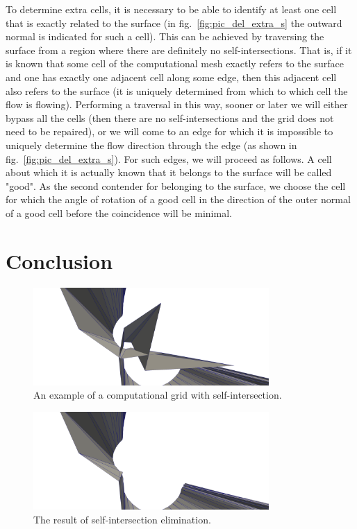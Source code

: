 \documentclass[
11pt,%
tightenlines,%
twoside,%
onecolumn,%
nofloats,%
nobibnotes,%
nofootinbib,%
superscriptaddress,%
noshowpacs,%
centertags]%
{revtex4}
\begin{document}
To determine extra cells, it is necessary to be able to identify at least one cell that is exactly related to the surface (in fig.~\ref{fig:pic_del_extra_s} the outward normal is indicated for such a cell).
This can be achieved by traversing the surface from a region where there are definitely no self-intersections.
That is, if it is known that some cell of the computational mesh exactly refers to the surface and one has exactly one adjacent cell along some edge, then this adjacent cell also refers to the surface (it is uniquely determined from which to which cell the flow is flowing).
Performing a traversal in this way, sooner or later we will either bypass all the cells (then there are no self-intersections and the grid does not need to be repaired), or we will come to an edge for which it is impossible to uniquely determine the flow direction through the edge (as shown in fig.~\ref{fig:pic_del_extra_s}).
For such edges, we will proceed as follows.
A cell about which it is actually known that it belongs to the surface will be called "good".
As the second contender for belonging to the surface, we choose the cell for which the angle of rotation of a good cell in the direction of the outer normal of a good cell before the coincidence will be minimal.

\section{Conclusion}

\begin{figure}[h]
\includegraphics[width=0.8\textwidth]{pics/pic_example_before.png}
\caption{An example of a computational grid with self-intersection.}\label{fig:pic_example_before}
\end{figure}

\begin{figure}[h]
\includegraphics[width=0.8\textwidth]{pics/pic_example_after.png}
\caption{The result of self-intersection elimination.}\label{fig:pic_example_after}
\end{figure}
\end{document}
